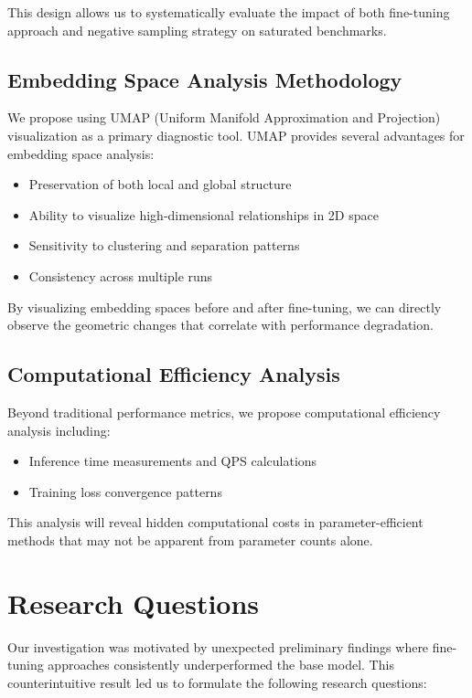This design allows us to systematically evaluate the impact of both fine-tuning approach and negative sampling strategy on saturated benchmarks.

\subsection{Embedding Space Analysis Methodology}

We propose using UMAP (Uniform Manifold Approximation and Projection) visualization as a primary diagnostic tool. UMAP provides several advantages for embedding space analysis:

\begin{itemize}
\item Preservation of both local and global structure
\item Ability to visualize high-dimensional relationships in 2D space
\item Sensitivity to clustering and separation patterns
\item Consistency across multiple runs
\end{itemize}

By visualizing embedding spaces before and after fine-tuning, we can directly observe the geometric changes that correlate with performance degradation.

\subsection{Computational Efficiency Analysis}

Beyond traditional performance metrics, we propose computational efficiency analysis including:

\begin{itemize}
\item Inference time measurements and QPS calculations
\item Training loss convergence patterns
\end{itemize}

This analysis will reveal hidden computational costs in parameter-efficient methods that may not be apparent from parameter counts alone.

\section{Research Questions}

Our investigation was motivated by unexpected preliminary findings where fine-tuning approaches consistently underperformed the base model. This counterintuitive result led us to formulate the following research questions:

